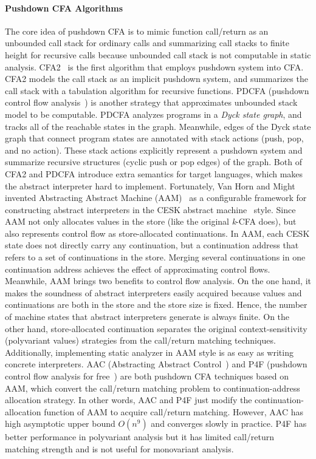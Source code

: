 \documentclass[12pt]{report}
\begin{document}
\paragraph{Pushdown CFA Algorithms}
The core idea of pushdown CFA is to mimic function call/return as an unbounded call stack for ordinary calls and summarizing call stacks to finite height for recursive calls because unbounded call stack is not computable in static analysis.
CFA2~\cite{vardoulakis2010cfa2} is the first algorithm that employs pushdown system into CFA\@.
CFA2 models the call stack as an implicit pushdown system, and summarizes the call stack with a tabulation algorithm for recursive functions.
PDCFA (pushdown control flow analysis~\cite{earl2010pushdown})
is another strategy that approximates unbounded stack model to be computable.
PDCFA analyzes programs in a \emph{Dyck state graph}, and tracks all of the reachable states in the graph.
Meanwhile, edges of the Dyck state graph that connect program states are annotated with stack actions (push, pop, and no action).
These stack actions explicitly represent a pushdown system and summarize recursive structures (cyclic push or pop edges) of the graph.
Both of CFA2 and PDCFA introduce extra semantics for target languages, which makes the abstract interpreter hard to implement.
Fortunately, Van Horn and Might
invented Abstracting Abstract Machine (AAM)~\cite{van2010abstracting}
as a configurable framework for constructing abstract interpreters in the CESK abstract machine~\cite{felleisen1987calculus} style.
Since AAM not only allocates values in the store (like the original \textit{k}-CFA does), but also represents control flow as store-allocated continuations.
In AAM, each CESK state does not directly carry any continuation, but a continuation address that refers to a set of continuations in the store.
Merging several continuations in one continuation address achieves the effect of approximating control flows.
Meanwhile, AAM brings two benefits to control flow analysis.
On the one hand, it makes the soundness of abstract interpreters easily acquired because values and continuations are both in the store and
the store size is fixed.
Hence, the number of machine states that abstract interpreters generate is always finite.
On the other hand, store-allocated continuation separates the original context-sensitivity (polyvariant values) strategies from
the call/return matching techniques.
Additionally, implementing static analyzer in AAM style is as easy as writing concrete interpreters.
AAC (Abstracting Abstract Control~\cite{johnson2015abstracting}) and P4F (pushdown control flow analysis for free~\cite{gilray2016pushdown})
are both pushdown CFA techniques based on AAM\@, which convert the call/return matching problem to continuation-address allocation strategy.
In other words, AAC and P4F just modify the continuation-allocation function of AAM to acquire call/return matching.
However, AAC has high asymptotic upper bound $O(n^9)$ and converges slowly in practice. %
P4F has better performance in polyvariant analysis but it has limited call/return matching strength
and is not useful for monovariant analysis.
\end{document}

